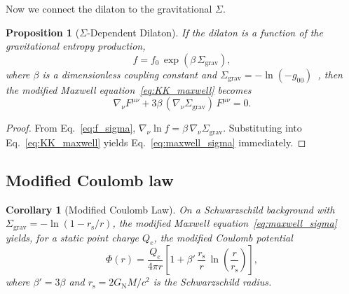 \documentclass[letterpaper,twocolumn,superscriptaddress,longbibliography]{revtex4-2}
\newtheorem{proposition}[theorem]{Proposition}
\newtheorem{corollary}[theorem]{Corollary}
\newcommand{\rs}{r_{\mathrm{s}}}
\newcommand{\Sgrav}{\Sigma_{\mathrm{grav}}}
\newcommand{\GN}{G_{\mathrm{N}}}
\begin{document}
Now we connect the dilaton to the gravitational $\Sigma$.

\begin{proposition}[$\Sigma$-Dependent Dilaton]
\label{prop:dilaton}
If the dilaton is a function of the gravitational entropy
production,
\begin{equation}
  f = f_0\,\exp(\beta\,\Sgrav),
  \label{eq:f_sigma}
\end{equation}
where $\beta$ is a dimensionless coupling constant and
$\Sgrav = -\ln(-g_{00})$~\cite{PaperII}, then the
modified Maxwell equation~\eqref{eq:KK_maxwell} becomes
\begin{equation}
  \nabla_\nu F^{\mu\nu}
  + 3\beta\,(\nabla_\nu\Sgrav)\,F^{\mu\nu} = 0.
  \label{eq:maxwell_sigma}
\end{equation}
\end{proposition}

\begin{proof}
From Eq.~\eqref{eq:f_sigma},
$\nabla_\nu\ln f = \beta\,\nabla_\nu\Sgrav$.
Substituting into Eq.~\eqref{eq:KK_maxwell} yields
Eq.~\eqref{eq:maxwell_sigma} immediately.
\end{proof}

\subsection{Modified Coulomb law}
\label{sec:coulomb}

\begin{corollary}[Modified Coulomb Law]
\label{cor:coulomb}
On a Schwarzschild background with $\Sgrav = -\ln(1 - \rs/r)$,
the modified Maxwell equation~\eqref{eq:maxwell_sigma}
yields, for a static point charge $Q_e$, the modified
Coulomb potential
\begin{equation}
  \Phi(r) = \frac{Q_e}{4\pi r}
  \left[1 + \beta'\,\frac{\rs}{r}\,
  \ln\!\left(\frac{r}{\rs}\right)\right],
  \label{eq:modified_coulomb}
\end{equation}
where $\beta' = 3\beta$ and $\rs = 2\GN M/c^2$ is the
Schwarzschild radius.
\end{corollary}
\end{document}
